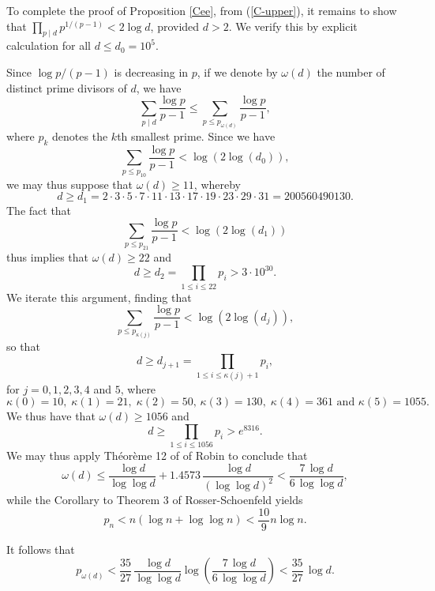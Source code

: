 To complete the proof of Proposition \ref{Cee}, from (\ref{C-upper}), it remains to show that $\prod_{p \mid d} p^{1/(p-1)}  < 2 \log d$, provided $d > 2$. 
We verify this by explicit calculation for all $d \leq d_0 = 10^5$. 

Since $\log p/ (p-1)$ is decreasing in $p$, if we denote by $\omega (d)$ the number of distinct prime divisors of $d$, we have
\begin{equation} \label{ome}
\sum_{p\mid d} \frac{\log p}{p-1} \leq \sum_{p \leq p_{\omega (d)}} \frac{\log p}{p-1},
\end{equation}
where $p_k$ denotes the $k$th smallest prime. Since we have
$$
 \sum_{p \leq p_{10}} \frac{\log p}{p-1} < \log (2 \log (d_0)),
 $$
 we may thus suppose that $\omega (d) \geq 11$, whereby 
 $$
 d \geq d_1 = 2 \cdot 3 \cdot 5 \cdot 7 \cdot 11 \cdot 13 \cdot 17 \cdot 19 \cdot 23 \cdot 29 \cdot 31 = 200560490130.
$$
The fact that
$$
 \sum_{p \leq p_{21}} \frac{\log p}{p-1} < \log (2 \log (d_1))
 $$
 thus implies that $\omega (d) \geq 22$ and
 $$
 d \geq d_2 = \prod_{1 \leq i \leq 22} p_i > 3 \cdot 10^{30}.
 $$
 We iterate this argument, finding that
 $$
 \sum_{p \leq p_{\kappa (j)}} \frac{\log p}{p-1} < \log (2 \log (d_j)),
 $$
 so that 
 $$
 d \geq d_{j+1} = \prod_{1 \leq i \leq \kappa (j) + 1} p_i,
 $$
for $j=0, 1, 2, 3, 4$ and $5$, where
 $$
 \kappa (0)=10, \; \kappa (1) = 21, \; \kappa (2) = 50, \, \kappa (3) = 130, \; \kappa (4) = 361 \mbox{ and } \kappa (5) = 1055.
 $$
We thus have that $\omega (d) \geq 1056$ and 
$$
d \geq \prod_{1 \leq i \leq 1056} p_i > e^{8316}.
$$
We may thus apply Th\'eor\`eme 12 of  of Robin \cite{Ro} to conclude that
$$
\omega (d) \leq \frac{\log d}{\log \log d} + 1.4573 \, \frac{\log d}{(\log \log d)^2}  <  \frac{7 \, \log d}{6 \, \log \log d},
$$
while the Corollary to Theorem 3 of Rosser-Schoenfeld yields 
$$
p_n < n (\log n + \log \log n) < \frac{10}{9} n \log n.
$$

It follows that
$$
p_{\omega (d)} < \frac{35}{27} \, \frac{\log d}{\log \log d} \log \left(  \frac{7 \, \log d}{6 \, \log \log d} \right) <  \frac{35}{27} \, \log d.
$$


